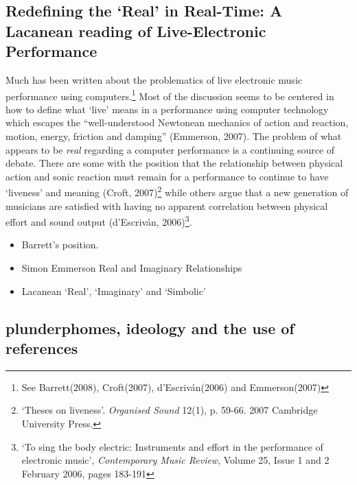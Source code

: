 \subsection{Redefining the `Real' in Real-Time: A Lacanean reading of Live-Electronic Performance}
Much has been written about the problematics of live electronic music performance using computers.\footnote{ See Barrett(2008), Croft(2007), d'Escriv\'{a}n(2006) and Emmerson(2007)} Most of the discussion seems to be centered in how to define what `live' means in a performance using computer technology which escapes the ``well-understood Newtonean mechanics of action and reaction, motion, energy, friction and damping'' (Emmerson, 2007). The problem of what appears to be \emph{real} regarding a computer performance is a continuing source of debate. There are some with the position that the relationship between physical action and sonic reaction must remain for a performance to continue to have `liveness' and meaning (Croft, 2007)\footnote{`Theses on liveness'. \emph{Organised Sound} 12(1), p. 59-66. 2007 Cambridge University Press.} while others argue that a new generation of musicians are satisfied with having no apparent correlation between physical effort and sound output (d'Escriv\'{a}n, 2006)\footnote{`To sing the body electric: Instruments and effort in the performance of electronic music', \emph{Contemporary Music Review}, Volume 25, Issue 1 and 2 February 2006, pages 183-191}. 
\begin{itemize}
\item
Barrett's position. 
\item
Simon Emmerson Real and Imaginary Relationships
\item
Lacanean `Real', `Imaginary' and `Simbolic'
\end{itemize}


\subsection{plunderphomes, ideology and the use of references}

